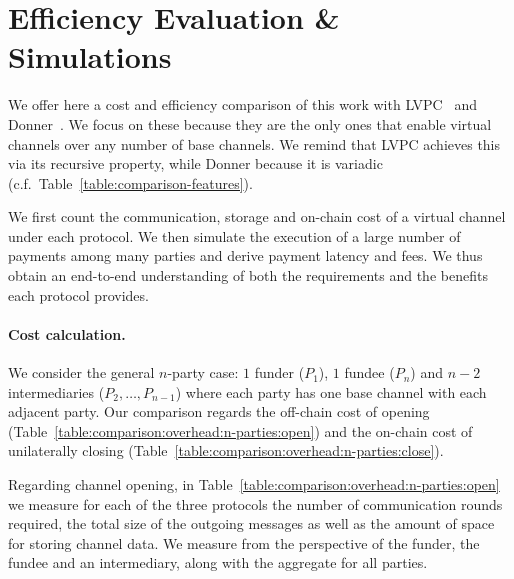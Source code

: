 \section{Efficiency Evaluation \& Simulations}
  \label{section:comparison}
  We offer here a cost and efficiency comparison of this work with
  LVPC~\cite{10.1007/978-3-030-65411-5_18} and Donner~\cite{donner}. We focus on
  these because they are the only ones that enable
  virtual channels over any number of base channels. We remind that LVPC
  achieves this via its recursive property, while Donner
  because it is variadic (c.f.\ Table~\ref{table:comparison-features}).

  We first count the communication, storage and on-chain cost of a virtual
  channel under each protocol. We then simulate the execution of a large number
  of payments among many parties and derive payment latency and fees. We thus
  obtain an end-to-end understanding of both the requirements and the benefits
  each protocol provides.

  \paragraph{Cost calculation.} We consider the general $n$-party case: $1$
  funder ($P_1$), $1$ fundee ($P_n$) and $n-2$ intermediaries ($P_2, \dots,
  P_{n-1}$) where each party has one base channel with each adjacent party. Our
  comparison regards the off-chain cost of opening
  (Table~\ref{table:comparison:overhead:n-parties:open}) and the on-chain cost
  of unilaterally closing
  (Table~\ref{table:comparison:overhead:n-parties:close}).

  Regarding channel opening, in
  Table~\ref{table:comparison:overhead:n-parties:open} we measure for each of
  the three protocols the number of communication rounds required, the total
  size of the outgoing messages as well as the amount of space for storing
  channel data. We measure from the perspective of the funder, the fundee
  and an intermediary, along with the aggregate for all parties.

